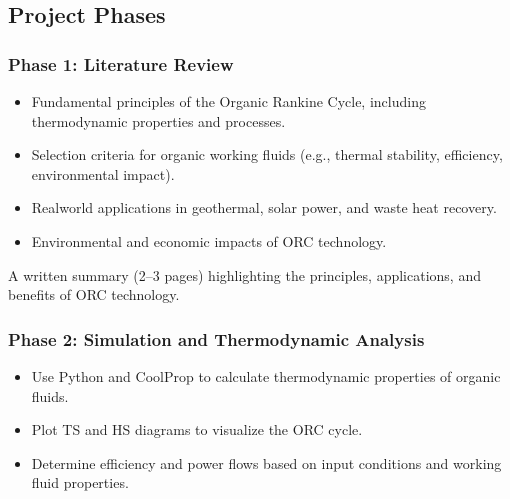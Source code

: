\documentclass[letterpaper,10pt,english]{jupyterBook}
\begin{document}
\subsection{Project Phases}
\label{\detokenize{ProjectInstructions:id2}}

\subsubsection{Phase 1: Literature Review}
\label{\detokenize{ProjectInstructions:id3}}
\sphinxAtStartPar
{}
\begin{itemize}
\item {} 
\sphinxAtStartPar
Fundamental principles of the Organic Rankine Cycle, including
thermodynamic properties and processes.

\item {} 
\sphinxAtStartPar
Selection criteria for organic working fluids (e.g., thermal
stability, efficiency, environmental impact).

\item {} 
\sphinxAtStartPar
Real\sphinxhyphen{}world applications in geothermal, solar power, and waste heat
recovery.

\item {} 
\sphinxAtStartPar
Environmental and economic impacts of ORC technology.

\end{itemize}

\sphinxAtStartPar
{} A written summary (2–3 pages) highlighting the
principles, applications, and benefits of ORC technology.


\subsubsection{Phase 2: Simulation and Thermodynamic Analysis}
\label{\detokenize{ProjectInstructions:phase-2-simulation-and-thermodynamic-analysis}}
\sphinxAtStartPar
{}
\begin{itemize}
\item {} 
\sphinxAtStartPar
Use Python and CoolProp to calculate thermodynamic properties of
organic fluids.

\item {} 
\sphinxAtStartPar
Plot T\sphinxhyphen{}S and H\sphinxhyphen{}S diagrams to visualize the ORC cycle.

\item {} 
\sphinxAtStartPar
Determine efficiency and power flows based on input conditions and
working fluid properties.

\end{itemize}
\end{document}
